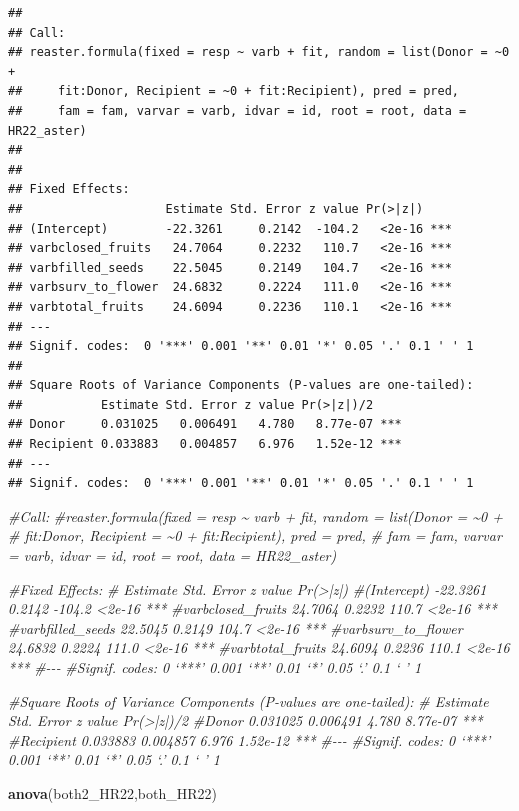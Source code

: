 \documentclass[
]{article}
\newenvironment{Shaded}{\begin{snugshade}}{\end{snugshade}}
\newcommand{\CommentTok}[1]{\textcolor[rgb]{0.56,0.35,0.01}{\textit{#1}}}
\newcommand{\FunctionTok}[1]{\textcolor[rgb]{0.13,0.29,0.53}{\textbf{#1}}}
\newcommand{\NormalTok}[1]{#1}
\begin{document}
\begin{verbatim}
## 
## Call:
## reaster.formula(fixed = resp ~ varb + fit, random = list(Donor = ~0 + 
##     fit:Donor, Recipient = ~0 + fit:Recipient), pred = pred, 
##     fam = fam, varvar = varb, idvar = id, root = root, data = HR22_aster)
## 
## 
## Fixed Effects:
##                    Estimate Std. Error z value Pr(>|z|)    
## (Intercept)        -22.3261     0.2142  -104.2   <2e-16 ***
## varbclosed_fruits   24.7064     0.2232   110.7   <2e-16 ***
## varbfilled_seeds    22.5045     0.2149   104.7   <2e-16 ***
## varbsurv_to_flower  24.6832     0.2224   111.0   <2e-16 ***
## varbtotal_fruits    24.6094     0.2236   110.1   <2e-16 ***
## ---
## Signif. codes:  0 '***' 0.001 '**' 0.01 '*' 0.05 '.' 0.1 ' ' 1
## 
## Square Roots of Variance Components (P-values are one-tailed):
##           Estimate Std. Error z value Pr(>|z|)/2    
## Donor     0.031025   0.006491   4.780   8.77e-07 ***
## Recipient 0.033883   0.004857   6.976   1.52e-12 ***
## ---
## Signif. codes:  0 '***' 0.001 '**' 0.01 '*' 0.05 '.' 0.1 ' ' 1
\end{verbatim}

\begin{Shaded}
\begin{Highlighting}[]
\CommentTok{\#Call:}
\CommentTok{\#reaster.formula(fixed = resp \textasciitilde{} varb + fit, random = list(Donor = \textasciitilde{}0 + }
\CommentTok{\#    fit:Donor, Recipient = \textasciitilde{}0 + fit:Recipient), pred = pred, }
\CommentTok{\#    fam = fam, varvar = varb, idvar = id, root = root, data = HR22\_aster)}


\CommentTok{\#Fixed Effects:}
\CommentTok{\#                   Estimate Std. Error z value Pr(\textgreater{}|z|)    }
\CommentTok{\#(Intercept)        {-}22.3261     0.2142  {-}104.2   \textless{}2e{-}16 ***}
\CommentTok{\#varbclosed\_fruits   24.7064     0.2232   110.7   \textless{}2e{-}16 ***}
\CommentTok{\#varbfilled\_seeds    22.5045     0.2149   104.7   \textless{}2e{-}16 ***}
\CommentTok{\#varbsurv\_to\_flower  24.6832     0.2224   111.0   \textless{}2e{-}16 ***}
\CommentTok{\#varbtotal\_fruits    24.6094     0.2236   110.1   \textless{}2e{-}16 ***}
\CommentTok{\#{-}{-}{-}}
\CommentTok{\#Signif. codes:  0 ‘***’ 0.001 ‘**’ 0.01 ‘*’ 0.05 ‘.’ 0.1 ‘ ’ 1}

\CommentTok{\#Square Roots of Variance Components (P{-}values are one{-}tailed):}
\CommentTok{\#          Estimate Std. Error z value Pr(\textgreater{}|z|)/2    }
\CommentTok{\#Donor     0.031025   0.006491   4.780   8.77e{-}07 ***}
\CommentTok{\#Recipient 0.033883   0.004857   6.976   1.52e{-}12 ***}
\CommentTok{\#{-}{-}{-}}
\CommentTok{\#Signif. codes:  0 ‘***’ 0.001 ‘**’ 0.01 ‘*’ 0.05 ‘.’ 0.1 ‘ ’ 1}

\FunctionTok{anova}\NormalTok{(both2\_HR22,both\_HR22)}
\end{Highlighting}
\end{Shaded}
\end{document}

